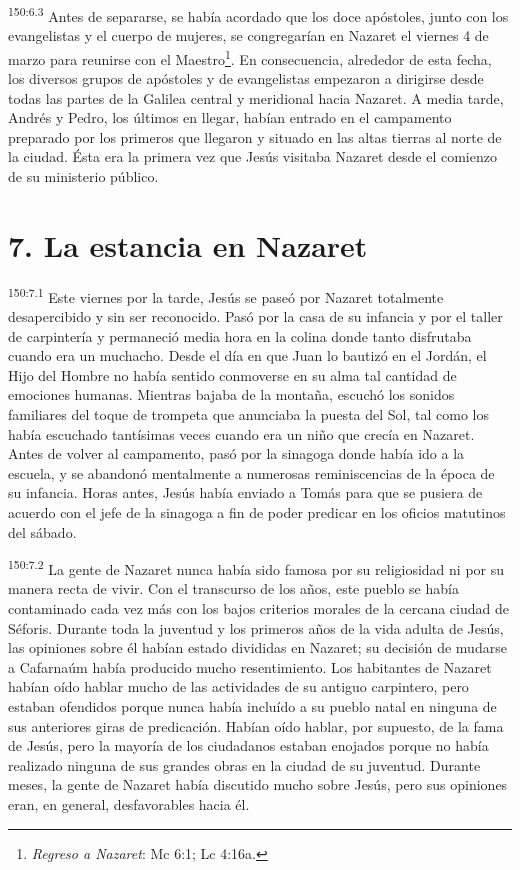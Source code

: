 \par
\textsuperscript{150:6.3} Antes de separarse, se había acordado que los doce apóstoles, junto con los evangelistas y el cuerpo de mujeres, se congregarían en Nazaret el viernes 4 de marzo para reunirse con el Maestro\footnote{\textit{Regreso a Nazaret}: Mc 6:1; Lc 4:16a.}. En consecuencia, alrededor de esta fecha, los diversos grupos de apóstoles y de evangelistas empezaron a dirigirse desde todas las partes de la Galilea central y meridional hacia Nazaret. A media tarde, Andrés y Pedro, los últimos en llegar, habían entrado en el campamento preparado por los primeros que llegaron y situado en las altas tierras al norte de la ciudad. Ésta era la primera vez que Jesús visitaba Nazaret desde el comienzo de su ministerio público.

\section*{7. La estancia en Nazaret}
\par
\textsuperscript{150:7.1} Este viernes por la tarde, Jesús se paseó por Nazaret totalmente desapercibido y sin ser reconocido. Pasó por la casa de su infancia y por el taller de carpintería y permaneció media hora en la colina donde tanto disfrutaba cuando era un muchacho. Desde el día en que Juan lo bautizó en el Jordán, el Hijo del Hombre no había sentido conmoverse en su alma tal cantidad de emociones humanas. Mientras bajaba de la montaña, escuchó los sonidos familiares del toque de trompeta que anunciaba la puesta del Sol, tal como los había escuchado tantísimas veces cuando era un niño que crecía en Nazaret. Antes de volver al campamento, pasó por la sinagoga donde había ido a la escuela, y se abandonó mentalmente a numerosas reminiscencias de la época de su infancia. Horas antes, Jesús había enviado a Tomás para que se pusiera de acuerdo con el jefe de la sinagoga a fin de poder predicar en los oficios matutinos del sábado.

\par
\textsuperscript{150:7.2} La gente de Nazaret nunca había sido famosa por su religiosidad ni por su manera recta de vivir. Con el transcurso de los años, este pueblo se había contaminado cada vez más con los bajos criterios morales de la cercana ciudad de Séforis. Durante toda la juventud y los primeros años de la vida adulta de Jesús, las opiniones sobre él habían estado divididas en Nazaret; su decisión de mudarse a Cafarnaúm había producido mucho resentimiento. Los habitantes de Nazaret habían oído hablar mucho de las actividades de su antiguo carpintero, pero estaban ofendidos porque nunca había incluído a su pueblo natal en ninguna de sus anteriores giras de predicación. Habían oído hablar, por supuesto, de la fama de Jesús, pero la mayoría de los ciudadanos estaban enojados porque no había realizado ninguna de sus grandes obras en la ciudad de su juventud. Durante meses, la gente de Nazaret había discutido mucho sobre Jesús, pero sus opiniones eran, en general, desfavorables hacia él.

